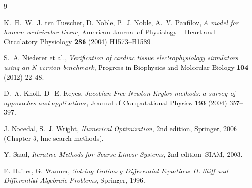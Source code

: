 \documentclass[11pt,a4paper]{article}
\begin{document}
\begin{thebibliography}{9}

 K.~H.~W.~J. ten Tusscher, D. Noble, P.~J. Noble, A.~V.
    Panfilov, \emph{A model for human ventricular tissue},
    American Journal of Physiology -- Heart and Circulatory Physiology
    \textbf{286} (2004) H1573--H1589.

 S.~A. Niederer et al.,
    \emph{Verification of cardiac tissue electrophysiology simulators
    using an N-version benchmark}, Progress in Biophysics and Molecular
    Biology \textbf{104} (2012) 22--48.

 D.~A. Knoll, D.~E. Keyes,
    \emph{Jacobian-Free Newton-Krylov methods: a survey of approaches
    and applications}, Journal of Computational Physics \textbf{193}
    (2004) 357--397.

 J. Nocedal, S.~J. Wright,
    \emph{Numerical Optimization}, 2nd edition, Springer, 2006
    (Chapter 3, line-search methods).

 Y. Saad,
    \emph{Iterative Methods for Sparse Linear Systems}, 2nd edition,
    SIAM, 2003.

 E. Hairer, G. Wanner,
    \emph{Solving Ordinary Differential Equations II: Stiff and
    Differential-Algebraic Problems}, Springer, 1996.

\end{thebibliography}
\end{document}

